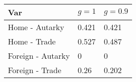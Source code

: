 \begin{tabular}{@{}lll@{}}
    \toprule
    Var               & $g = 1$ & $g = 0.9$ \\ \midrule
    Home - Autarky    & 0.421   & 0.421     \\
    Home - Trade      & 0.527   & 0.487      \\
    Foreign - Autarky & 0  & 0    \\
    Foreign - Trade   & 0.26   & 0.202   \\ \bottomrule
    \end{tabular}